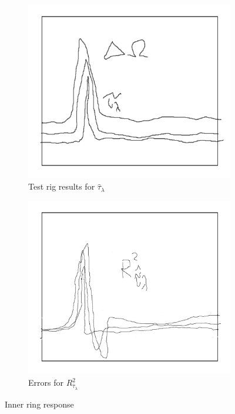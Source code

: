 \begin{figure}[hbtp]
\vspace{-10pt}
\centering
\begin{subfigure}{0.49\textwidth}
\centering
\includegraphics[width=\textwidth]{graphs/tau-lambda}
\caption{Test rig results for $\hat{\tau}_\lambda$}
\label{fig:tau-lambda}
\end{subfigure}
\begin{subfigure}{0.49\textwidth}
\centering
\includegraphics[width=\textwidth]{graphs/tau-lambda-r}
\caption{Errors for $R^2_{\hat{\tau}_\lambda}$}
\label{fig:tau-lambda-r}
\end{subfigure}
\vspace{-8pt}
\caption{Inner ring response}
\vspace{-10pt}
\end{figure}
